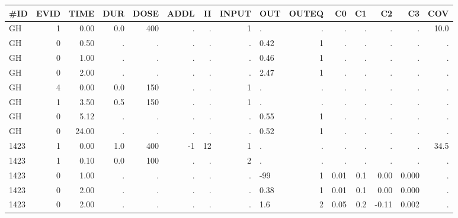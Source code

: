 \documentclass[
]{book}
\begin{document}
\begin{tabular}{l|r|r|r|r|r|r|r|l|r|r|r|r|r|r}
\hline
\#ID & EVID & TIME & DUR & DOSE & ADDL & II & INPUT & OUT & OUTEQ & C0 & C1 & C2 & C3 & COV\\
\hline
GH & 1 & 0.00 & 0.0 & 400 & . & . & 1 & . & . & . & . & . & . & 10.0\\
\hline
GH & 0 & 0.50 & . & . & . & . & . & 0.42 & 1 & . & . & . & . & .\\
\hline
GH & 0 & 1.00 & . & . & . & . & . & 0.46 & 1 & . & . & . & . & .\\
\hline
GH & 0 & 2.00 & . & . & . & . & . & 2.47 & 1 & . & . & . & . & .\\
\hline
GH & 4 & 0.00 & 0.0 & 150 & . & . & 1 & . & . & . & . & . & . & .\\
\hline
GH & 1 & 3.50 & 0.5 & 150 & . & . & 1 & . & . & . & . & . & . & .\\
\hline
GH & 0 & 5.12 & . & . & . & . & . & 0.55 & 1 & . & . & . & . & .\\
\hline
GH & 0 & 24.00 & . & . & . & . & . & 0.52 & 1 & . & . & . & . & .\\
\hline
1423 & 1 & 0.00 & 1.0 & 400 & -1 & 12 & 1 & . & . & . & . & . & . & 34.5\\
\hline
1423 & 1 & 0.10 & 0.0 & 100 & . & . & 2 & . & . & . & . & . & . & .\\
\hline
1423 & 0 & 1.00 & . & . & . & . & . & -99 & 1 & 0.01 & 0.1 & 0.00 & 0.000 & .\\
\hline
1423 & 0 & 2.00 & . & . & . & . & . & 0.38 & 1 & 0.01 & 0.1 & 0.00 & 0.000 & .\\
\hline
1423 & 0 & 2.00 & . & . & . & . & . & 1.6 & 2 & 0.05 & 0.2 & -0.11 & 0.002 & .\\
\hline
\end{tabular}
\end{document}
